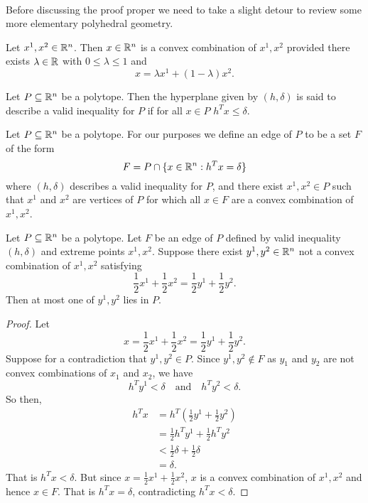 \paragraph{}
Before discussing the proof proper we need to take a slight detour to review some more elementary polyhedral geometry.
\begin{definition}
Let $x^1, x^2 \in \mathbb{R}^n$. Then $x \in \mathbb{R}^n$ is a convex combination of $x^1, x^2$ provided there exists $\lambda \in \mathbb{R}$ with $0 \leq \lambda \leq 1$ and $$x = \lambda x^1 + (1-\lambda)x^2.$$
\end{definition}
\begin{definition}
Let $P\subseteq \mathbb{R}^n$ be a polytope. Then the hyperplane given by $(h,\delta)$ is said to describe a valid inequality for $P$ if for all $x \in P$ $h^Tx \leq \delta$.
\end{definition}
\begin{definition}
Let $P \subseteq \mathbb{R}^n$ be a polytope. For our purposes we define an edge of $P$ to be a set $F$ of the form $$F = P \cap \{x \in \mathbb{R}^n: h^Tx = \delta \}$$ where $(h,\delta)$ describes a valid inequality for $P$, and there exist $x^1, x^2 \in P$ such that $x^1$ and $x^2$ are vertices of $P$ for which all $x \in F$ are a convex combination of $x^1, x^2$.
\end{definition}
\begin{lemma}\label{lemma:edge-midpoint}
Let $P \subseteq \mathbb{R}^n$ be a polytope. Let $F$ be an edge of $P$ defined by valid inequality $(h,\delta)$ and extreme points $x^1, x^2$. Suppose there exist $y^1, y^2 \in \mathbb{R}^n$ not a convex combination of $x^1, x^2$ satisfying
$$\frac{1}{2}x^1 + \frac{1}{2} x^2 = \frac{1}{2} y^1 + \frac{1}{2}y^2.$$
Then at most one of $y^1, y^2$ lies in $P$.
\end{lemma}
\begin{proof}
Let $$x = \frac{1}{2}x^1 + \frac{1}{2} x^2 = \frac{1}{2} y^1 + \frac{1}{2}y^2.$$ Suppose for a contradiction that $y^1,y^2 \in P$. Since $y^1, y^2 \not\in F$ as $y_1$ and $y_2$ are not convex combinations of $x_1$ and $x_2$, we have
$$h^Ty^1 < \delta \quad\text{and}\quad h^Ty^2 < \delta. $$
So then,
\begin{align*}
h^Tx &= h^T(\frac{1}{2}y^1 + \frac{1}{2}y^2) \\
&= \frac{1}{2}h^Ty^1 + \frac{1}{2}h^Ty^2 \\
&< \frac{1}{2}\delta + \frac{1}{2}\delta \\
&= \delta.
\end{align*}
That is $h^T x < \delta$. But since $x = \frac{1}{2} x^1 + \frac{1}{2}x^2$, $x$ is a convex combination of $x^1, x^2$ and hence $x \in F$. That is $h^T x = \delta$, contradicting $h^T x < \delta$.
\end{proof}
